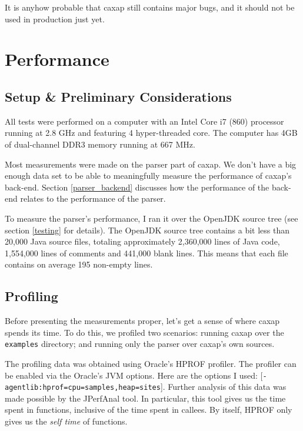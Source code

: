 It is anyhow probable that caxap still contains major bugs, and it should not be
used in production just yet.

\section{Performance}
\label{perf}

\subsection{Setup \& Preliminary Considerations}

All tests were performed on a computer with an Intel Core i7 (860) processor
running at 2.8 GHz and featuring 4 hyper-threaded core. The computer has 4GB of
dual-channel DDR3 memory running at 667 MHz.

Most measurements were made on the parser part of caxap. We don't have a big
enough data set to be able to meaningfully measure the performance of caxap's
back-end. Section \ref{parser_backend} discusses how the performance of the
back-end relates to the performance of the parser.

To measure the parser's performance, I ran it over the OpenJDK source tree (see
section \ref{testing} for details). The OpenJDK source tree contains a bit less
than 20,000 Java source files, totaling approximately 2,360,000 lines of Java
code, 1,554,000 lines of comments and 441,000 blank lines. This means that each
file contains on average 195 non-empty lines.

\subsection{Profiling}
\label{perf_profiling}

Before presenting the measurements proper, let's get a sense of where caxap
spends its time. To do this, we profiled two scenarios: running caxap over the
\texttt{examples} directory; and running only the parser over caxap's own
sources.

The profiling data was obtained using Oracle's HPROF \cite{hprof} profiler. The
profiler can be enabled via the Oracle's JVM options. Here are the options I
used: [\texttt{-agentlib:hprof=cpu=samples,heap=sites}]. Further analysis of
this data was made possible by the JPerfAnal tool. \cite{jperfanal} In
particular, this tool gives us the time spent in functions, inclusive of the
time spent in callees. By itself, HPROF only gives us the \emph{self time} of
functions.

